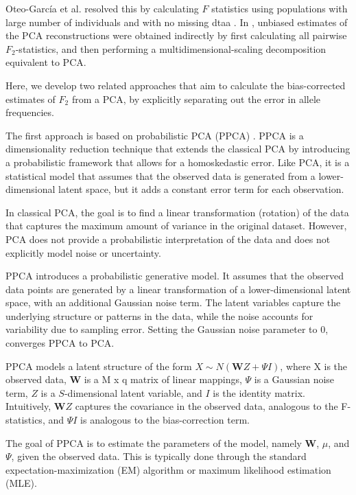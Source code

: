 \documentclass[12pt, letterpaper]{article}
\begin{document}
Oteo-García et al. resolved this by calculating $F$ statistics using populations with large number of individuals and with no missing dtaa \cite{oteo-garcia_geometrical_2021}. In \cite{peter_geometric_2022}, unbiased estimates of the PCA reconstructions were obtained indirectly by first calculating all pairwise $F_2$-statistics, and then performing a multidimensional-scaling decomposition equivalent to PCA. 

Here, we develop two related approaches that aim to calculate the bias-corrected estimates of $F_2$ from a PCA, by explicitly separating out the error in allele frequencies.

The first approach is based on probabilistic PCA (PPCA) \cite{tipping_probabilistic_nodate, agrawal_scalable_2020}.
PPCA is a dimensionality reduction technique that extends the classical PCA by introducing a probabilistic framework that allows for a homoskedastic error. Like PCA, it is a statistical model that assumes that the observed data is generated from a lower-dimensional latent space, but it adds a constant error term for each observation.

In classical PCA, the goal is to find a linear transformation (rotation) of the data that captures the maximum amount of variance in the original dataset. However, PCA does not provide a probabilistic interpretation of the data and does not explicitly model noise or uncertainty.

PPCA introduces a probabilistic generative model. It assumes that the observed data points are generated by a linear transformation of a lower-dimensional latent space, with an additional Gaussian noise term. The latent variables capture the underlying structure or patterns in the data, while the noise accounts for variability due to sampling error. Setting the Gaussian noise parameter to 0, converges PPCA to PCA.

PPCA models a latent structure of the form $X \sim N(\mathbf{W}Z + \Psi I)$, where X is the observed data, $\mathbf{W}$ is a M x q matrix of linear mappings, $\Psi$ is a Gaussian noise term, $Z$ is a $S$-dimensional latent variable, and $I$ is the identity matrix. Intuitively, $\mathbf{W}Z$ captures the covariance in the observed data, analogous to the F-statistics, and $\Psi I$ is analogous to the bias-correction term.

The goal of PPCA is to estimate the parameters of the model, namely $\mathbf{W}$, $\mu$, and $\Psi$, given the observed data. This is typically done through the standard expectation-maximization (EM) algorithm or maximum likelihood estimation (MLE).
\end{document}
